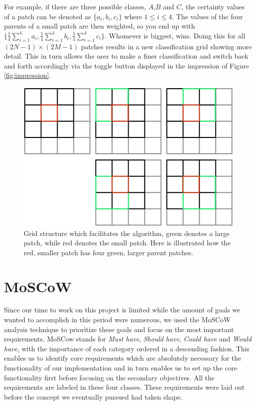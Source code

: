 \documentclass[a4paper,onecolumn]{report}
\begin{document}
For example, if there are three possible classes, $A$,$B$ and $C$, the certainty values of a patch can be denoted as $\{a_i, b_i, c_i\}$ where $1 \leq i \leq 4$. The values of the four parents of a small patch are then weighted, so you end up with $\{ \frac{1}{4}\sum_{i=1}^{4} a_i, \frac{1}{4}\sum_{i=1}^{4} b_i, \frac{1}{4}\sum_{i=1}^{4} c_i\}$. Whomever is biggest, wins. Doing this for all $(2N - 1) \times (2M - 1)$ patches results in a new classification grid showing more detail. This in turn allows the user to make a finer classification and switch back and forth accordingly via the toggle button displayed in the impression of Figure \ref{fig:impression}.

\begin{figure}[h!]
    \centering
    \includegraphics[scale=0.6]{./images/grid_explained.jpg}
    \caption{Grid structure which facilitates the algorithm, green denotes a large patch, while red denotes the small patch. Here is illustrated how the red, smaller patch has four green, larger parent patches.}
	\label{fig:grid}
\end{figure}

\section{MoSCoW}
\label{sec:MoSCoW requirements}
Since our time to work on this project is limited while the amount of goals we wanted to accomplish in this period were numerous, we used the MoSCoW analysis technique to prioritize these goals and focus on the most important requirements. MoSCow stands for \textit{Must have}, \textit{Should have}, \textit{Could have} and \textit{Would have}, with the importance of each category ordered in a descending fashion. This enables us to identify core requirements which are absolutely necessary for the functionality of our implementation and in turn enables us to set up the core functionality first before focusing on the secondary objectives. All the requirements are labeled in these four classes. These requirements were laid out before the concept we eventually pursued had taken shape.\\
\end{document}
